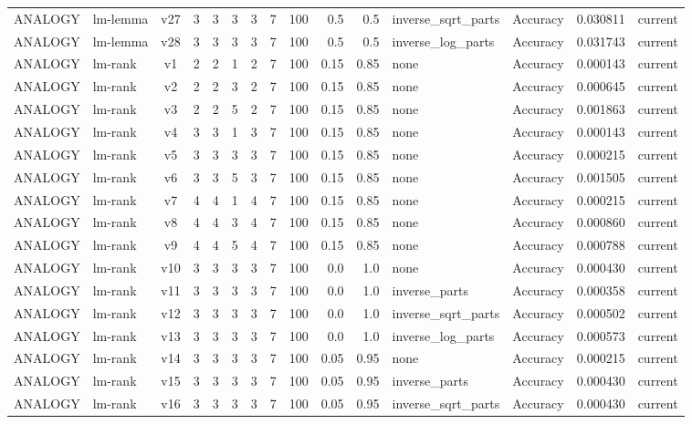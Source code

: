 \documentclass{article}
\begin{document}
\begin{xltabular}{\linewidth}{@{}lYcrrrrrrrrYlrl@{}}
ANALOGY & lm-lemma & v27 & 3 & 3 & 3 & 3 & 7 & 100 & 0.5 & 0.5 & inverse\_sqrt\_parts & Accuracy & 0.030811 & current \\
ANALOGY & lm-lemma & v28 & 3 & 3 & 3 & 3 & 7 & 100 & 0.5 & 0.5 & inverse\_log\_parts & Accuracy & 0.031743 & current \\
ANALOGY & lm-rank & v1 & 2 & 2 & 1 & 2 & 7 & 100 & 0.15 & 0.85 & none & Accuracy & 0.000143 & current \\
ANALOGY & lm-rank & v2 & 2 & 2 & 3 & 2 & 7 & 100 & 0.15 & 0.85 & none & Accuracy & 0.000645 & current \\
ANALOGY & lm-rank & v3 & 2 & 2 & 5 & 2 & 7 & 100 & 0.15 & 0.85 & none & Accuracy & 0.001863 & current \\
ANALOGY & lm-rank & v4 & 3 & 3 & 1 & 3 & 7 & 100 & 0.15 & 0.85 & none & Accuracy & 0.000143 & current \\
ANALOGY & lm-rank & v5 & 3 & 3 & 3 & 3 & 7 & 100 & 0.15 & 0.85 & none & Accuracy & 0.000215 & current \\
ANALOGY & lm-rank & v6 & 3 & 3 & 5 & 3 & 7 & 100 & 0.15 & 0.85 & none & Accuracy & 0.001505 & current \\
ANALOGY & lm-rank & v7 & 4 & 4 & 1 & 4 & 7 & 100 & 0.15 & 0.85 & none & Accuracy & 0.000215 & current \\
ANALOGY & lm-rank & v8 & 4 & 4 & 3 & 4 & 7 & 100 & 0.15 & 0.85 & none & Accuracy & 0.000860 & current \\
ANALOGY & lm-rank & v9 & 4 & 4 & 5 & 4 & 7 & 100 & 0.15 & 0.85 & none & Accuracy & 0.000788 & current \\
ANALOGY & lm-rank & v10 & 3 & 3 & 3 & 3 & 7 & 100 & 0.0 & 1.0 & none & Accuracy & 0.000430 & current \\
ANALOGY & lm-rank & v11 & 3 & 3 & 3 & 3 & 7 & 100 & 0.0 & 1.0 & inverse\_parts & Accuracy & 0.000358 & current \\
ANALOGY & lm-rank & v12 & 3 & 3 & 3 & 3 & 7 & 100 & 0.0 & 1.0 & inverse\_sqrt\_parts & Accuracy & 0.000502 & current \\
ANALOGY & lm-rank & v13 & 3 & 3 & 3 & 3 & 7 & 100 & 0.0 & 1.0 & inverse\_log\_parts & Accuracy & 0.000573 & current \\
ANALOGY & lm-rank & v14 & 3 & 3 & 3 & 3 & 7 & 100 & 0.05 & 0.95 & none & Accuracy & 0.000215 & current \\
ANALOGY & lm-rank & v15 & 3 & 3 & 3 & 3 & 7 & 100 & 0.05 & 0.95 & inverse\_parts & Accuracy & 0.000430 & current \\
ANALOGY & lm-rank & v16 & 3 & 3 & 3 & 3 & 7 & 100 & 0.05 & 0.95 & inverse\_sqrt\_parts & Accuracy & 0.000430 & current \\

\end{xltabular}
\end{document}
